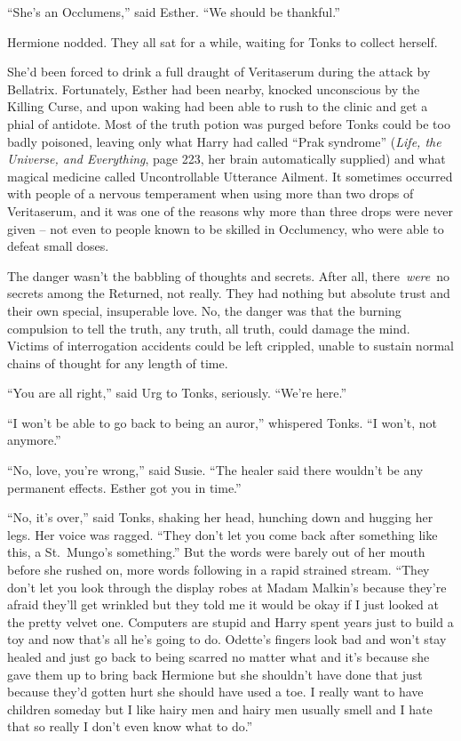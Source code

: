 ``She's an Occlumens,'' said Esther. ``We should be thankful.''

Hermione nodded. They all sat for a while, waiting for Tonks to collect
herself.

She'd been forced to drink a full draught of Veritaserum during the
attack by Bellatrix. Fortunately, Esther had been nearby, knocked
unconscious by the Killing Curse, and upon waking had been able to rush
to the clinic and get a phial of antidote. Most of the truth potion was
purged before Tonks could be too badly poisoned, leaving only what Harry
had called ``Prak syndrome'' (\emph{Life, the Universe, and Everything},
page 223, her brain automatically supplied) and what magical medicine
called Uncontrollable Utterance Ailment. It sometimes occurred with
people of a nervous temperament when using more than two drops of
Veritaserum, and it was one of the reasons why more than three drops
were never given -- not even to people known to be skilled in
Occlumency, who were able to defeat small doses.

The danger wasn't the babbling of thoughts and secrets. After all,
there~\emph{were}~no secrets among the Returned, not really. They had
nothing but absolute trust and their own special, insuperable love. No,
the danger was that the burning compulsion to tell the truth, any truth,
all truth, could damage the mind. Victims of interrogation accidents
could be left crippled, unable to sustain normal chains of thought for
any length of time.

``You are all right,'' said Urg to Tonks, seriously. ``We're here.''

``I won't be able to go back to being an auror,'' whispered Tonks. ``I
won't, not anymore.''

``No, love, you're wrong,'' said Susie. ``The healer said there wouldn't
be any permanent effects. Esther got you in time.''

``No, it's over,'' said Tonks, shaking her head, hunching down and
hugging her legs. Her voice was ragged. ``They don't let you come back
after something like this, a St.~Mungo's something.'' But the words were
barely out of her mouth before she rushed on, more words following in a
rapid strained stream. ``They don't let you look through the display
robes at Madam Malkin's because they're afraid they'll get wrinkled but
they told me it would be okay if I just looked at the pretty velvet one.
Computers are stupid and Harry spent years just to build a toy and now
that's all he's going to do. Odette's fingers look bad and won't stay
healed and just go back to being scarred no matter what and it's because
she gave them up to bring back Hermione but she shouldn't have done that
just because they'd gotten hurt she should have used a toe. I really
want to have children someday but I like hairy men and hairy men usually
smell and I hate that so really I don't even know what to do.''

